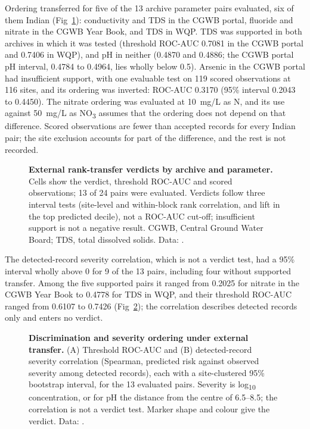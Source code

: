 \documentclass[10pt,letterpaper]{article}
\begin{document}
Ordering transferred for five of the 13 archive \texttimes{} parameter pairs evaluated, six of them Indian (Fig~\ref{fig:transfer-verdicts}): conductivity and TDS in the CGWB portal, fluoride and nitrate in the CGWB Year Book, and TDS in WQP. TDS was supported in both archives in which it was tested (threshold ROC-AUC 0.7081 in the CGWB portal and 0.7406 in WQP), and pH in neither (0.4870 and 0.4886; the CGWB portal pH interval, 0.4784 to 0.4964, lies wholly below 0.5). Arsenic in the CGWB portal had insufficient support, with one evaluable test on 119 scored observations at 116 sites, and its ordering was inverted: ROC-AUC 0.3170 (95\% interval 0.2043 to 0.4450). The nitrate ordering was evaluated at 10~mg/L as N, and its use against 50~mg/L as NO\textsubscript{3} assumes that the ordering does not depend on that difference. Scored observations are fewer than accepted records for every Indian pair; the site exclusion accounts for part of the difference, and the rest is not recorded.\label{callout:fig:transfer-verdicts}

\begin{figure}[!ht]
\caption{\textbf{External rank-transfer verdicts by archive and parameter.} Cells show the verdict, threshold ROC-AUC and scored observations; 13 of 24 pairs were evaluated. Verdicts follow three interval tests (site-level and within-block rank correlation, and lift in the top predicted decile), not a ROC-AUC cut-off; insufficient support is not a negative result. CGWB, Central Ground Water Board; TDS, total dissolved solids. Data: .}
\label{fig:transfer-verdicts}
\end{figure}

The detected-record severity correlation, which is not a verdict test, had a 95\% interval wholly above 0 for 9 of the 13 pairs, including four without supported transfer. Among the five supported pairs it ranged from 0.2025 for nitrate in the CGWB Year Book to 0.4778 for TDS in WQP, and their threshold ROC-AUC ranged from 0.6107 to 0.7426 (Fig~\ref{fig:transfer-ordering}); the correlation describes detected records only and enters no verdict.\label{callout:fig:transfer-ordering}

\begin{figure}[!ht]
\caption{\textbf{Discrimination and severity ordering under external transfer.} (A) Threshold ROC-AUC and (B) detected-record severity correlation (Spearman, predicted risk against observed severity among detected records), each with a site-clustered 95\% bootstrap interval, for the 13 evaluated pairs. Severity is log\textsubscript{10} concentration, or for pH the distance from the centre of 6.5--8.5; the correlation is not a verdict test. Marker shape and colour give the verdict. Data: .}
\label{fig:transfer-ordering}
\end{figure}
\end{document}
